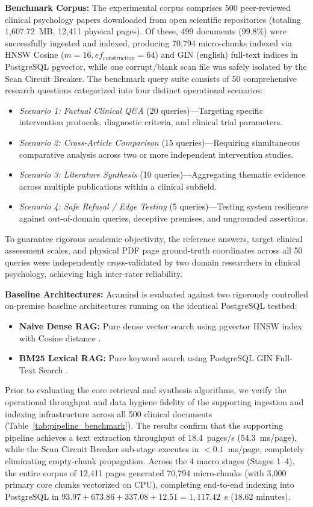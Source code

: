 \documentclass[10pt]{SPIIRAS_Proceedings}
\begin{document}
\textbf{Benchmark Corpus:} The experimental corpus comprises 500 peer-reviewed clinical psychology papers downloaded from open scientific repositories (totaling 1,607.72~MB, 12,411 physical pages). Of these, 499 documents (99.8\%) were successfully ingested and indexed, producing 70,794 micro-chunks indexed via HNSW Cosine ($m = 16, ef_{\text{construction}} = 64$) and GIN (english) full-text indices in PostgreSQL pgvector, while one corrupt/blank scan file was safely isolated by the Scan Circuit Breaker. The benchmark query suite consists of 50 comprehensive research questions categorized into four distinct operational scenarios:
\begin{itemize}
    \item \textit{Scenario 1: Factual Clinical Q\&A} (20 queries)---Targeting specific intervention protocols, diagnostic criteria, and clinical trial parameters.
    \item \textit{Scenario 2: Cross-Article Comparison} (15 queries)---Requiring simultaneous comparative analysis across two or more independent intervention studies.
    \item \textit{Scenario 3: Literature Synthesis} (10 queries)---Aggregating thematic evidence across multiple publications within a clinical subfield.
    \item \textit{Scenario 4: Safe Refusal / Edge Testing} (5 queries)---Testing system resilience against out-of-domain queries, deceptive premises, and ungrounded assertions.
\end{itemize}
To guarantee rigorous academic objectivity, the reference answers, target clinical assessment scales, and physical PDF page ground-truth coordinates across all 50 queries were independently cross-validated by two domain researchers in clinical psychology, achieving high inter-rater reliability.

\textbf{Baseline Architectures:} Acamind is evaluated against two rigorously controlled on-premise baseline architectures running on the identical PostgreSQL testbed:
\begin{itemize}
    \item \textbf{Naive Dense RAG:} Pure dense vector search using pgvector HNSW index with Cosine distance \cite{lewis2020retrieval,wang2022text}.
    \item \textbf{BM25 Lexical RAG:} Pure keyword search using PostgreSQL GIN Full-Text Search \cite{robertson2009probabilistic}.
\end{itemize}

Prior to evaluating the core retrieval and synthesis algorithms, we verify the operational throughput and data hygiene fidelity of the supporting ingestion and indexing infrastructure across all 500 clinical documents (Table~\ref{tab:pipeline_benchmark}). The results confirm that the supporting pipeline achieves a text extraction throughput of 18.4~pages/s (54.3~ms/page), while the Scan Circuit Breaker sub-stage executes in $<0.1$~ms/page, completely eliminating empty-chunk propagation. Across the 4 macro stages (Stages 1--4), the entire corpus of 12,411 pages generated 70,794 micro-chunks (with 3,000 primary core chunks vectorized on CPU), completing end-to-end indexing into PostgreSQL in $93.97 + 673.86 + 337.08 + 12.51 = 1,117.42$~s (18.62 minutes).
\end{document}
